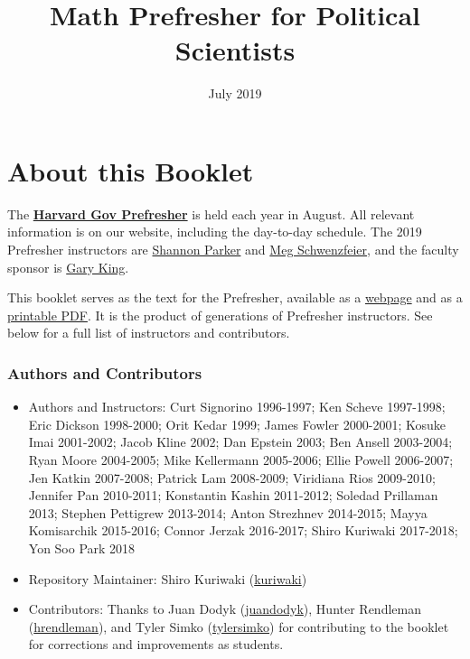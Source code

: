 \documentclass[]{book}
\title{Math Prefresher for Political Scientists}
\author{}
\date{July 2019}
\providecommand{\tightlist}{%
  \setlength{\itemsep}{0pt}\setlength{\parskip}{0pt}}
\theoremstyle{definition}
\theoremstyle{definition}
\theoremstyle{definition}
\theoremstyle{remark}
\begin{document}
\maketitle

{
\setcounter{tocdepth}{1}
\tableofcontents
}
\chapter*{About this Booklet}\label{about-this-booklet}

The \href{https://projects.iq.harvard.edu/prefresher}{\textbf{Harvard
Gov Prefresher}} is held each year in August. All relevant information
is on our website, including the day-to-day schedule. The 2019
Prefresher instructors are
\href{https://wcfia.harvard.edu/shannon-lynn-parker}{Shannon Parker} and
\href{http://schwenzfeier.github.io/}{Meg Schwenzfeier}, and the faculty
sponsor is \href{https://gking.harvard.edu}{Gary King}.

This booklet serves as the text for the Prefresher, available as a
\href{https://iqss.github.io/prefresher/}{webpage} and as a
\href{https://github.com/IQSS/prefresher/releases}{printable PDF}. It is
the product of generations of Prefresher instructors. See below for a
full list of instructors and contributors.

\subsection*{Authors and Contributors}\label{authors-and-contributors}

\begin{itemize}
\tightlist
\item
  Authors and Instructors: Curt Signorino 1996-1997; Ken Scheve
  1997-1998; Eric Dickson 1998-2000; Orit Kedar 1999; James Fowler
  2000-2001; Kosuke Imai 2001-2002; Jacob Kline 2002; Dan Epstein 2003;
  Ben Ansell 2003-2004; Ryan Moore 2004-2005; Mike Kellermann 2005-2006;
  Ellie Powell 2006-2007; Jen Katkin 2007-2008; Patrick Lam 2008-2009;
  Viridiana Rios 2009-2010; Jennifer Pan 2010-2011; Konstantin Kashin
  2011-2012; Soledad Prillaman 2013; Stephen Pettigrew 2013-2014; Anton
  Strezhnev 2014-2015; Mayya Komisarchik 2015-2016; Connor Jerzak
  2016-2017; Shiro Kuriwaki 2017-2018; Yon Soo Park 2018
\item
  Repository Maintainer: Shiro Kuriwaki
  (\href{https://github.com/kuriwaki}{kuriwaki})
\item
  Contributors: Thanks to Juan Dodyk
  (\href{https://github.com/juandodyk}{juandodyk}), Hunter Rendleman
  (\href{https://github.com/hrendleman}{hrendleman}), and Tyler Simko
  (\href{https://github.com/tylersimko}{tylersimko}) for contributing to
  the booklet for corrections and improvements as students.
\end{itemize}
\end{document}
